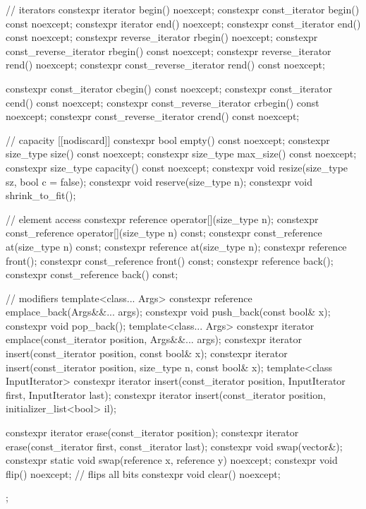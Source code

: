 \begin{codeblock}
{{    // iterators
    constexpr iterator               begin() noexcept;
    constexpr const_iterator         begin() const noexcept;
    constexpr iterator               end() noexcept;
    constexpr const_iterator         end() const noexcept;
    constexpr reverse_iterator       rbegin() noexcept;
    constexpr const_reverse_iterator rbegin() const noexcept;
    constexpr reverse_iterator       rend() noexcept;
    constexpr const_reverse_iterator rend() const noexcept;

    constexpr const_iterator         cbegin() const noexcept;
    constexpr const_iterator         cend() const noexcept;
    constexpr const_reverse_iterator crbegin() const noexcept;
    constexpr const_reverse_iterator crend() const noexcept;

    // capacity
    [[nodiscard]] constexpr bool empty() const noexcept;
    constexpr size_type size() const noexcept;
    constexpr size_type max_size() const noexcept;
    constexpr size_type capacity() const noexcept;
    constexpr void      resize(size_type sz, bool c = false);
    constexpr void      reserve(size_type n);
    constexpr void      shrink_to_fit();

    // element access
    constexpr reference       operator[](size_type n);
    constexpr const_reference operator[](size_type n) const;
    constexpr const_reference at(size_type n) const;
    constexpr reference       at(size_type n);
    constexpr reference       front();
    constexpr const_reference front() const;
    constexpr reference       back();
    constexpr const_reference back() const;

    // modifiers
    template<class... Args> constexpr reference emplace_back(Args&&... args);
    constexpr void push_back(const bool& x);
    constexpr void pop_back();
    template<class... Args> constexpr iterator emplace(const_iterator position, Args&&... args);
    constexpr iterator insert(const_iterator position, const bool& x);
    constexpr iterator insert(const_iterator position, size_type n, const bool& x);
    template<class InputIterator>
      constexpr iterator insert(const_iterator position,
                                InputIterator first, InputIterator last);
    constexpr iterator insert(const_iterator position, initializer_list<bool> il);

    constexpr iterator erase(const_iterator position);
    constexpr iterator erase(const_iterator first, const_iterator last);
    constexpr void swap(vector&);
    constexpr static void swap(reference x, reference y) noexcept;
    constexpr void flip() noexcept;     // flips all bits
    constexpr void clear() noexcept;
  };
}
\end{codeblock}%

